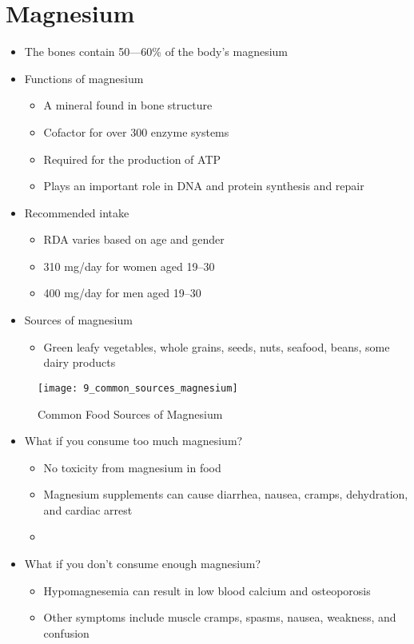 \documentclass[title={Chapter 9}]{fdsn201notes}
\begin{document}
\section{Magnesium}\label{sec:Magnesium}
\begin{itemize}
	\item The bones contain 50---60\% of the body’s magnesium
	\item Functions of magnesium
	\begin{itemize}
		\item A mineral found in bone structure
		\item Cofactor for over 300 enzyme systems
		\item Required for the production of ATP
		\item Plays an important role in DNA and protein synthesis and repair
	\end{itemize}
	\item Recommended intake
	\begin{itemize}
		\item RDA varies based on age and gender
		\item 310 mg/day for women aged 19--30
		\item 400 mg/day for men aged 19--30
	\end{itemize}
	\item Sources of magnesium
	\begin{itemize}
		\item Green leafy vegetables, whole grains, seeds, nuts, seafood, beans, some dairy products
	\end{itemize}
\end{itemize}

\begin{figure}[H]
	\centering
	\texttt{[image: 9\_common\_sources\_magnesium]}
	\caption{Common Food Sources of Magnesium}
	\label{fig:magnesium-common-food-sources}
\end{figure}

\begin{itemize}
	\item What if you consume too much magnesium?
	\begin{itemize}
		\item No toxicity from magnesium in food
		\item Magnesium supplements can cause diarrhea, nausea, cramps, dehydration, and cardiac arrest
		\item {}
	\end{itemize}
	\item What if you don’t consume enough magnesium?
	\begin{itemize}
		\item Hypomagnesemia can result in low blood calcium and osteoporosis
		\item Other symptoms include muscle cramps, spasms, nausea, weakness, and confusion
	\end{itemize}
\end{itemize}
\end{document}
